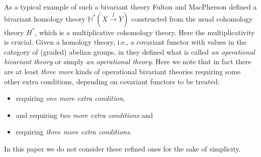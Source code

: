 \documentclass[a4paper]{amsart}
\begin{document}
As a typical example of such a bivariant theory Fulton and MacPherson defined a bivariant homology theory $\mathbb H^*(X \xrightarrow f Y)$ constructed from the usual cohomology theory $H^*$, which is a multiplicative cohomology theory. Here the multiplicativity is crucial. Given a homology theory, i.e., a covariant functor with values in the category of (graded) abelian groups, in \cite[\S 8.1]{FM} they defined what is called \emph{an operational bivariant theory} or simply \emph{an operational theory}. 
Here we note that in fact there are at least \emph{three more} kinds of operational bivariant theories requiring some other extra conditions, depending on covariant functors to be treated:
\begin{itemize}
\item \cite [\S 8.3]{FM} requiring \emph{one more extra condition}, 
\item \cite[\S 17.1]{Ful} and \cite{AP, AGP} requiring \emph{two more extra conditions} and 
\item \cite{GK} requiring \emph{three more extra conditions}.
\end{itemize}
In this paper we do not consider these refined ones for the sake of simplicity.
\end{document}
